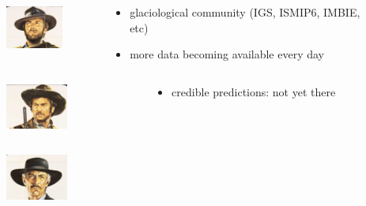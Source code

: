 \documentclass[hide notes,intlimits]{beamer}
\begin{document}
\begin{frame}
  \begin{columns}[c]
    \begin{column}{.2\linewidth}
      \begin{figure}
        \includegraphics[height=1.5cm]{thegood}
      \end{figure}
    \end{column}
    \begin{column}{.7\linewidth}
      \begin{itemize}
      \item glaciological community (IGS, ISMIP6, IMBIE, etc)
      \item more data becoming available every day
      \end{itemize}
    \end{column}
  \end{columns}
  \vspace{2em}
  \begin{columns}[c]
    \begin{column}{.2\linewidth}
      \begin{figure}
        \includegraphics[height=1.5cm]{thebad}
      \end{figure}
    \end{column}
    \begin{column}{.7\linewidth}
      \begin{itemize}
      \item credible predictions: not yet there
      \end{itemize}
    \end{column}
  \end{columns}
  \vspace{2em}
  \begin{columns}[c]
    \begin{column}{.2\linewidth}
      \begin{figure}
        \includegraphics[height=1.5cm]{theugly}

\end{figure}
\end{column}
\end{columns}
\end{frame}
\end{document}
